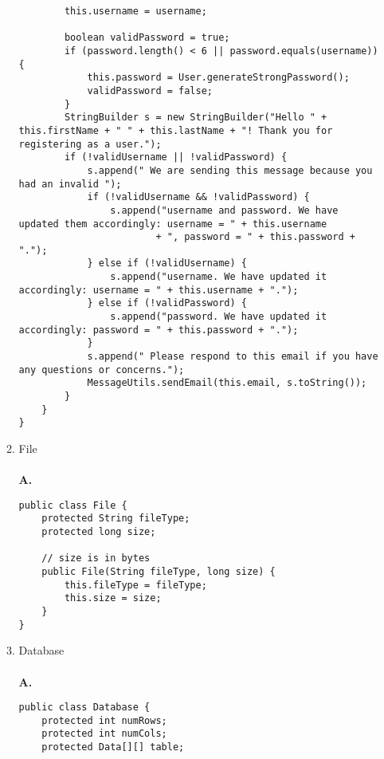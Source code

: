 \documentclass[12pt]{article}
\begin{document}
\begin{enumerate}
\begin{enumerate}[label=(\alph*)]
\begin{lstlisting}
		this.username = username;
		
		boolean validPassword = true;
		if (password.length() < 6 || password.equals(username)) {
			this.password = User.generateStrongPassword();
			validPassword = false;
		}
		StringBuilder s = new StringBuilder("Hello " + this.firstName + " " + this.lastName + "! Thank you for registering as a user.");
		if (!validUsername || !validPassword) {
			s.append(" We are sending this message because you had an invalid ");
			if (!validUsername && !validPassword) {
				s.append("username and password. We have updated them accordingly: username = " + this.username
						+ ", password = " + this.password + ".");
			} else if (!validUsername) {
				s.append("username. We have updated it accordingly: username = " + this.username + ".");
			} else if (!validPassword) {
				s.append("password. We have updated it accordingly: password = " + this.password + ".");
			}
			s.append(" Please respond to this email if you have any questions or concerns.");
			MessageUtils.sendEmail(this.email, s.toString());
		}
	}
}
    \end{lstlisting}
    \item File
    \\\\
    \textbf{A.} 
    \begin{lstlisting}
public class File {
	protected String fileType;
	protected long size;

	// size is in bytes
	public File(String fileType, long size) {
		this.fileType = fileType;
		this.size = size;
	}
}
    \end{lstlisting}
    \item Database
    \\\\
    \textbf{A.} 
    \begin{lstlisting}
public class Database {
	protected int numRows;
	protected int numCols;
	protected Data[][] table;


\end{lstlisting}
\end{enumerate}
\end{enumerate}
\end{document}
